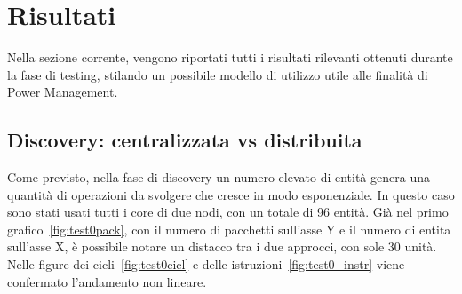 \chapter{Risultati}%

Nella sezione corrente, vengono riportati tutti i risultati rilevanti ottenuti durante la fase di testing, stilando un possibile modello di utilizzo utile alle finalità di Power Management.
\section{Discovery: centralizzata vs distribuita}
Come previsto, nella fase di discovery un numero elevato di entità genera una quantità di operazioni da svolgere che cresce in modo esponenziale. In questo caso sono stati usati tutti i core di due nodi, con un totale di 96 entità.
Già nel primo grafico~\ref{fig:test0pack}, con il numero di pacchetti sull'asse Y e il numero di entita sull'asse X, è possibile notare un distacco tra i due approcci, con sole 30 unità. Nelle figure dei cicli~\ref{fig:test0cicl} e delle istruzioni~\ref{fig:test0_instr} viene confermato l'andamento non lineare.

